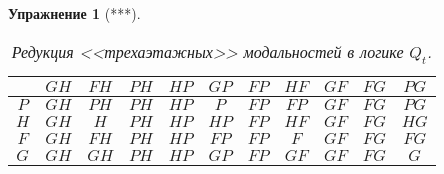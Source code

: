 \documentclass[11pt]{article}
\newtheorem{exercise}[theorem]{Упражнение}
\begin{document}
\begin{exercise}[***]
\begin{table}[hbt]
\begin{center}
\begin{tabular}{|c|c|c|c|c|c|c|c|c|c|c|}
\hline
    & $GH$ & $FH$ & $PH$ & $HP$ & $GP$ & $FP$ & $HF$ & $GF$ & $FG$ & $PG$ \\ \hline
$P$ & $GH$ & $PH$ & $PH$ & $HP$ & $P$  & $FP$ & $FP$ & $GF$ & $FG$ & $PG$ \\ \hline
$H$ & $GH$ & $H$  & $PH$ & $HP$ & $HP$ & $FP$ & $HF$ & $GF$ & $FG$ & $HG$ \\ \hline
$F$ & $GH$ & $FH$ & $PH$ & $HP$ & $FP$ & $FP$ & $F$  & $GF$ & $FG$ & $FG$ \\ \hline
$G$ & $GH$ & $GH$ & $PH$ & $HP$ & $GP$ & $FP$ & $GF$ & $GF$ & $FG$ & $G$  \\ \hline
\end{tabular}
\end{center} 
\caption{Редукция <<трехаэтажных>> модальностей в логике $Q_t$.} \label{Tab:1}
\end{table}

\end{exercise}
\end{document}
